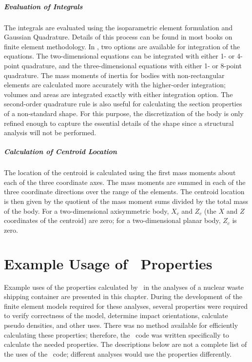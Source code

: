 \paragraph*{Evaluation of Integrals} The integrals are evaluated using
the isoparametric element formulation and Gaussian Quadrature.
Details of this process can be found in most books on finite element
methodology.  In \NUM, two options are available for integration of
the equations.  The two-dimensional equations can be integrated with
either 1- or 4-point quadrature, and the three-dimensional equations
with either 1- or 8-point quadrature.  The mass moments of inertia for
bodies with non-rectangular elements are calculated more accurately
with the higher-order integration; volumes and areas are integrated
exactly with either integration option.  The second-order quadrature
rule is also useful for calculating the section properties of a
non-standard shape.  For this purpose, the discretization of the body
is only refined enough to capture the essential details of the shape
since a structural analysis will not be performed.

\paragraph{Calculation of Centroid Location} The location of the
centroid is calculated using the first mass moments about each of the
three coordinate axes.  The mass moments are summed in each of the
three coordinate directions over the range of the elements.  The
centroid location is then given by the quotient of the mass moment
sums divided by the total mass of the body.  For a two-dimensional
axisymmetric body, $X_c$ and $Z_c$ (the $X$ and $Z$ coordinates of the
centroid) are zero; for a two-dimensional planar body,
$Z_c$ is zero.

\chapter{Example Usage of \NUM\ Properties}

Example uses of the properties calculated by \NUM\ in the analyses of
a nuclear waste shipping container are presented in this chapter.
During the development of the finite element models required for these
analyses, several properties were required to verify correctness of
the model, determine impact orientations, calculate pseudo densities,
and other uses. There was no method available for efficiently
calculating these properties; therefore, the \NUM\ code was written
specifically to calculate the needed properties.  The descriptions
below are not a complete list of the uses of the \NUM\ code; different
analyses would use the properties differently.

